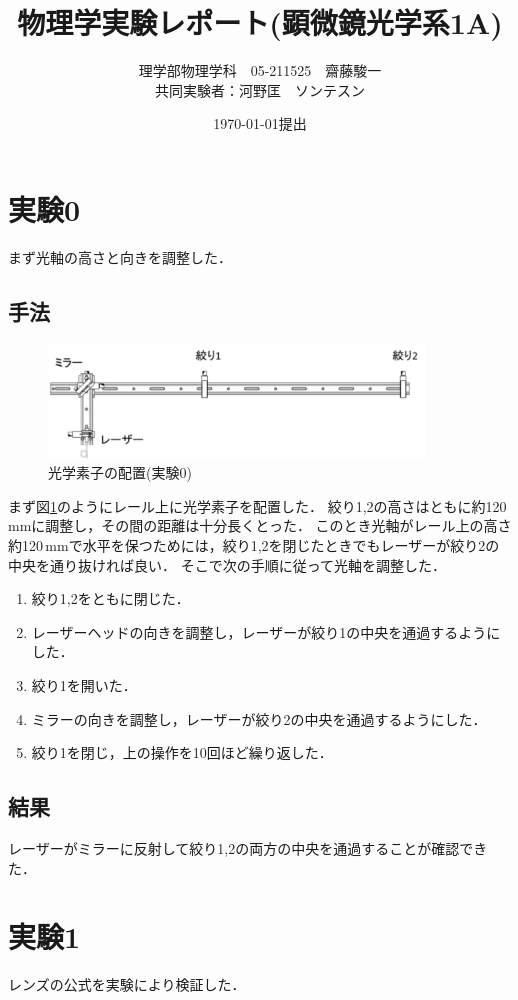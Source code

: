 \documentclass[titlepage]{jsarticle}
\title{物理学実験\ajRoman{2}レポート(顕微鏡光学系1A)}
\author{理学部物理学科　05-211525　齋藤駿一\\
共同実験者：河野匡　ソンテスン}
\date{\today 提出}
\begin{document}
\maketitle

\section{実験0}
まず光軸の高さと向きを調整した．

\subsection{手法}
\begin{figure}[htbp]
    \centering
    \includegraphics[width=10cm]{exp0.png}
    \caption{光学素子の配置(実験0)}
    \label{fig:exp0}
\end{figure}

まず図\ref{fig:exp0}のようにレール上に光学素子を配置した．
絞り1,2の高さはともに約120\,mmに調整し，その間の距離は十分長くとった．
このとき光軸がレール上の高さ約120\,mmで水平を保つためには，絞り1,2を閉じたときでもレーザーが絞り2の中央を通り抜ければ良い．
そこで次の手順に従って光軸を調整した．
\begin{enumerate}
    \item 絞り1,2をともに閉じた．
    \item レーザーヘッドの向きを調整し，レーザーが絞り1の中央を通過するようにした．
    \item 絞り1を開いた．
    \item ミラーの向きを調整し，レーザーが絞り2の中央を通過するようにした．
    \item 絞り1を閉じ，上の操作を10回ほど繰り返した．
\end{enumerate}

\subsection{結果}
レーザーがミラーに反射して絞り1,2の両方の中央を通過することが確認できた．

\section{実験1}
レンズの公式を実験により検証した．
\end{document}

